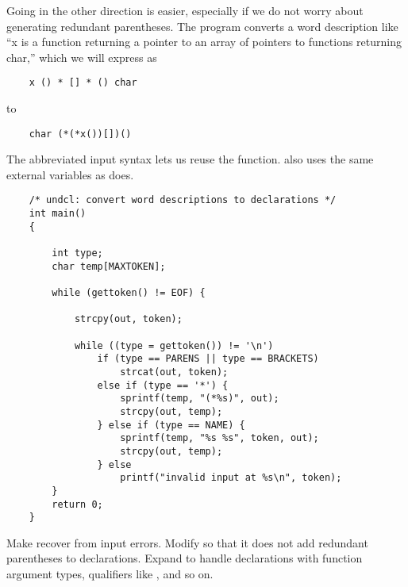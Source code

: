 Going in the other direction is easier, especially if we do not worry about generating redundant parentheses.
The program  converts a word description like ``x is a function returning a pointer to an array of pointers to functions returning char,'' which we will express as
\begin{lstlisting}
    x () * [] * () char
\end{lstlisting}
to
\begin{lstlisting}
    char (*(*x())[])()
\end{lstlisting}
The abbreviated input syntax lets us reuse the  function.  also uses the same external variables as  does.

\begin{lstlisting}
    /* undcl: convert word descriptions to declarations */
    int main()
    {

        int type;
        char temp[MAXTOKEN];

        while (gettoken() != EOF) {

            strcpy(out, token);

            while ((type = gettoken()) != '\n')
                if (type == PARENS || type == BRACKETS)
                    strcat(out, token);
                else if (type == '*') {
                    sprintf(temp, "(*%s)", out);
                    strcpy(out, temp);
                } else if (type == NAME) {
                    sprintf(temp, "%s %s", token, out);
                    strcpy(out, temp);
                } else
                    printf("invalid input at %s\n", token);
        }
        return 0;
    }
\end{lstlisting}

\begin{ExerciseList}
\Exercise Make  recover from input errors.
\Exercise Modify  so that it does not add redundant parentheses to declarations.
\Exercise Expand  to handle declarations with function argument types, qualifiers like , and so on.
\end{ExerciseList}

